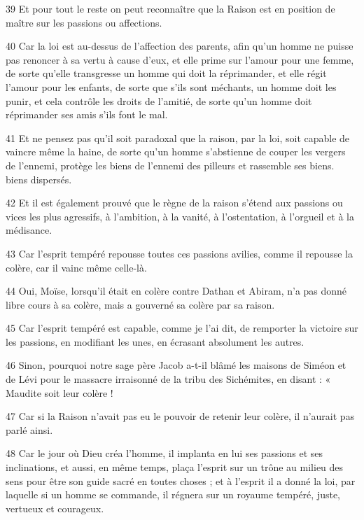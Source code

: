 \par 39 Et pour tout le reste on peut reconnaître que la Raison est en position de maître sur les passions ou affections.

\par 40 Car la loi est au-dessus de l'affection des parents, afin qu'un homme ne puisse pas renoncer à sa vertu à cause d'eux, et elle prime sur l'amour pour une femme, de sorte qu'elle transgresse un homme qui doit la réprimander, et elle régit l'amour pour les enfants, de sorte que s'ils sont méchants, un homme doit les punir, et cela contrôle les droits de l'amitié, de sorte qu'un homme doit réprimander ses amis s'ils font le mal.

\par 41 Et ne pensez pas qu'il soit paradoxal que la raison, par la loi, soit capable de vaincre même la haine, de sorte qu'un homme s'abstienne de couper les vergers de l'ennemi, protège les biens de l'ennemi des pilleurs et rassemble ses biens. biens dispersés.

\par 42 Et il est également prouvé que le règne de la raison s'étend aux passions ou vices les plus agressifs, à l'ambition, à la vanité, à l'ostentation, à l'orgueil et à la médisance.

\par 43 Car l'esprit tempéré repousse toutes ces passions avilies, comme il repousse la colère, car il vainc même celle-là.

\par 44 Oui, Moïse, lorsqu'il était en colère contre Dathan et Abiram, n'a pas donné libre cours à sa colère, mais a gouverné sa colère par sa raison.

\par 45 Car l'esprit tempéré est capable, comme je l'ai dit, de remporter la victoire sur les passions, en modifiant les unes, en écrasant absolument les autres.

\par 46 Sinon, pourquoi notre sage père Jacob a-t-il blâmé les maisons de Siméon et de Lévi pour le massacre irraisonné de la tribu des Sichémites, en disant : « Maudite soit leur colère !

\par 47 Car si la Raison n'avait pas eu le pouvoir de retenir leur colère, il n'aurait pas parlé ainsi.

\par 48 Car le jour où Dieu créa l'homme, il implanta en lui ses passions et ses inclinations, et aussi, en même temps, plaça l'esprit sur un trône au milieu des sens pour être son guide sacré en toutes choses ; et à l'esprit il a donné la loi, par laquelle si un homme se commande, il régnera sur un royaume tempéré, juste, vertueux et courageux.

